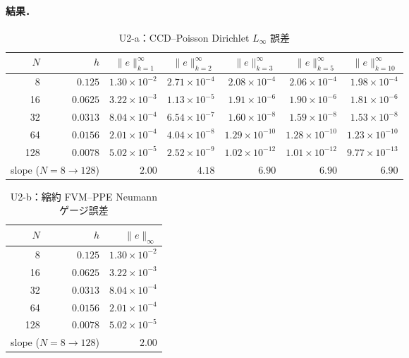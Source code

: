 \paragraph{結果．}

\begin{table}[!ht]
\caption{U2-a：CCD--Poisson Dirichlet \texorpdfstring{$L_\infty$}{L-infinity} 誤差}
\label{tab:U2_dirichlet}
\centering\small
\begin{tabular}{r r r r r r r}
\toprule
$N$ & $h$ & $\|e\|^\infty_{k=1}$ & $\|e\|^\infty_{k=2}$ & $\|e\|^\infty_{k=3}$ & $\|e\|^\infty_{k=5}$ & $\|e\|^\infty_{k=10}$ \\
\midrule
8   & $0.125$  & $1.30\!\times\!10^{-2}$ & $2.71\!\times\!10^{-4}$ & $2.08\!\times\!10^{-4}$ & $2.06\!\times\!10^{-4}$ & $1.98\!\times\!10^{-4}$ \\
16  & $0.0625$ & $3.22\!\times\!10^{-3}$ & $1.13\!\times\!10^{-5}$ & $1.91\!\times\!10^{-6}$ & $1.90\!\times\!10^{-6}$ & $1.81\!\times\!10^{-6}$ \\
32  & $0.0313$ & $8.04\!\times\!10^{-4}$ & $6.54\!\times\!10^{-7}$ & $1.60\!\times\!10^{-8}$ & $1.59\!\times\!10^{-8}$ & $1.53\!\times\!10^{-8}$ \\
64  & $0.0156$ & $2.01\!\times\!10^{-4}$ & $4.04\!\times\!10^{-8}$ & $1.29\!\times\!10^{-10}$ & $1.28\!\times\!10^{-10}$ & $1.23\!\times\!10^{-10}$ \\
128 & $0.0078$ & $5.02\!\times\!10^{-5}$ & $2.52\!\times\!10^{-9}$ & $1.02\!\times\!10^{-12}$ & $1.01\!\times\!10^{-12}$ & $9.77\!\times\!10^{-13}$ \\
\midrule
\multicolumn{2}{r}{slope ($N\!=\!8\!\to\!128$)} & $\mathbf{2.00}$ & $\mathbf{4.18}$ & $\mathbf{6.90}$ & $\mathbf{6.90}$ & $\mathbf{6.90}$ \\
\bottomrule
\end{tabular}
\end{table}

\begin{table}[!ht]
\caption{U2-b：縮約 FVM--PPE Neumann ゲージ誤差}
\label{tab:U2_neumann}
\centering\small
\begin{tabular}{r r r}
\toprule
$N$ & $h$ & $\|e\|_\infty$ \\
\midrule
8   & $0.125$  & $1.30\times 10^{-2}$ \\
16  & $0.0625$ & $3.22\times 10^{-3}$ \\
32  & $0.0313$ & $8.04\times 10^{-4}$ \\
64  & $0.0156$ & $2.01\times 10^{-4}$ \\
128 & $0.0078$ & $5.02\times 10^{-5}$ \\
\midrule
\multicolumn{2}{r}{slope ($N\!=\!8\!\to\!128$)} & $\mathbf{2.00}$ \\
\bottomrule
\end{tabular}
\end{table}


